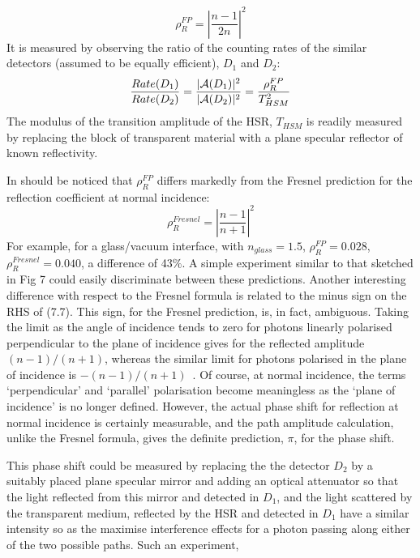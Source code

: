 \documentclass [12pt]{article}
\begin{document}
{\begin{equation}
 \rho_R^{FP} = \left|\frac{n-1}{2n}\right|^2
    \end{equation}
    It is measured by observing the ratio of the counting rates of the similar detectors (assumed
    to be equally efficient), $D_1$ and $D_2$:
    \begin{equation}
     \frac{Rate(D_1)}{Rate(D_2)} = \frac{|{\cal A}(D_1)|^2}{|{\cal A}(D_2)|^2} =\frac{\rho_R^{FP}}{T_{HSM}^2}     
\end{equation}
The modulus of the transition amplitude of the HSR, $T_{HSM}$  is readily measured by replacing the block of
 transparent material with  a plane specular reflector of known reflectivity.
  \par In should be noticed that $\rho_R^{FP}$ differs markedly from the Fresnel prediction
  for the reflection coefficient at normal incidence:
    \begin{equation}
  \rho_R^{Fresnel} = \left|\frac{n-1}{n+1}\right|^2
    \end{equation}
 For example, for a glass/vacuum interface, with $n_{
 glass} = 1.5$, $\rho_R^{FP} = 0.028$, 
   $\rho_R^{Fresnel} = 0.040$, a difference of 43$\%$. A simple experiment similar to that sketched
   in Fig 7 could easily discriminate between these predictions. Another interesting difference
   with respect to the Fresnel formula is related to the minus sign on the RHS of (7.7). This sign,
     for the Fresnel prediction, is, in fact, ambiguous. Taking the limit as the angle of incidence 
     tends to zero for photons linearly polarised perpendicular to the plane of incidence gives for the reflected
     amplitude $(n-1)/(n+1)$, whereas the similar limit for photons polarised in the plane of
     incidence is $-(n-1)/(n+1)$~\cite{BW3}. Of course, at normal incidence, the terms `perpendicular'
    and `parallel' polarisation become meaningless as the `plane of incidence' is no longer
    defined. However, the actual phase shift for reflection at normal incidence is certainly
    measurable, and the path amplitude calculation, unlike the Fresnel formula, gives the
    definite prediction, $\pi$, for the phase shift. 
   \par This phase shift could be measured by replacing the the detector $D_2$ by a suitably placed
    plane specular mirror and adding an optical attenuator so that the light reflected from 
    this mirror and detected in $D_1$, and the light scattered by the transparent medium, reflected
    by the HSR and detected in $D_1$ have a similar intensity so as the maximise interference
    effects  for a photon passing along either of the two possible paths. Such an experiment,
}
\end{document}
